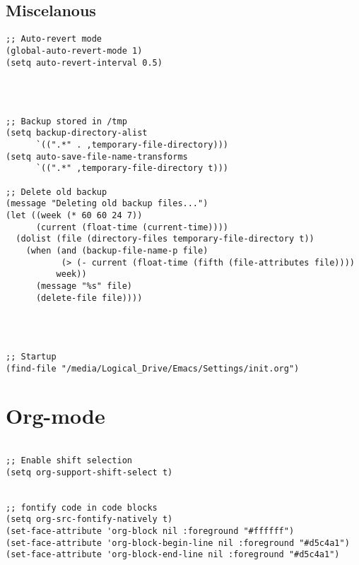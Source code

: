\documentclass[11pt]{article}
\begin{document}
\subsection{Miscelanous}
\label{sec:org9eec69f}
\begin{verbatim}
;; Auto-revert mode
(global-auto-revert-mode 1)
(setq auto-revert-interval 0.5)




;; Backup stored in /tmp
(setq backup-directory-alist
      `((".*" . ,temporary-file-directory)))
(setq auto-save-file-name-transforms
      `((".*" ,temporary-file-directory t)))

;; Delete old backup
(message "Deleting old backup files...")
(let ((week (* 60 60 24 7))
      (current (float-time (current-time))))
  (dolist (file (directory-files temporary-file-directory t))
    (when (and (backup-file-name-p file)
	       (> (- current (float-time (fifth (file-attributes file))))
		  week))
      (message "%s" file)
      (delete-file file))))




;; Startup
(find-file "/media/Logical_Drive/Emacs/Settings/init.org")

\end{verbatim}

\section{Org-mode}
\label{sec:org7938933}
\begin{verbatim}

;; Enable shift selection
(setq org-support-shift-select t)


;; fontify code in code blocks
(setq org-src-fontify-natively t)
(set-face-attribute 'org-block nil :foreground "#ffffff")
(set-face-attribute 'org-block-begin-line nil :foreground "#d5c4a1")
(set-face-attribute 'org-block-end-line nil :foreground "#d5c4a1")

\end{verbatim}
\end{document}
